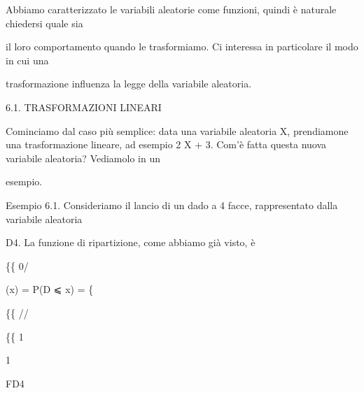 \documentclass[a4paper,portrait,12pt]{article}
\begin{document}
\begin{flushleft}
Abbiamo caratterizzato le variabili aleatorie come funzioni, quindi \`{e} naturale chiedersi quale sia
\end{flushleft}


\begin{flushleft}
il loro comportamento quando le trasformiamo. Ci interessa in particolare il modo in cui una
\end{flushleft}


\begin{flushleft}
trasformazione influenza la legge della variabile aleatoria.
\end{flushleft}





\begin{flushleft}
6.1. TRASFORMAZIONI LINEARI
\end{flushleft}


\begin{flushleft}
Cominciamo dal caso più semplice: data una variabile aleatoria X, prendiamone una trasformazione lineare, ad esempio 2 X + 3. Com'\`{e} fatta questa nuova variabile aleatoria? Vediamolo in un
\end{flushleft}


\begin{flushleft}
esempio.
\end{flushleft}


\begin{flushleft}
Esempio 6.1. Consideriamo il lancio di un dado a 4 facce, rappresentato dalla variabile aleatoria
\end{flushleft}


\begin{flushleft}
D4. La funzione di ripartizione, come abbiamo gi\`{a} visto, \`{e}
\end{flushleft}





\{\{ 0/


\begin{flushleft}
(x) = P(D ⩽ x) = \{
\end{flushleft}


\{\{ //


\{\{ 1


1





\begin{flushleft}
FD4
\end{flushleft}
\end{document}
